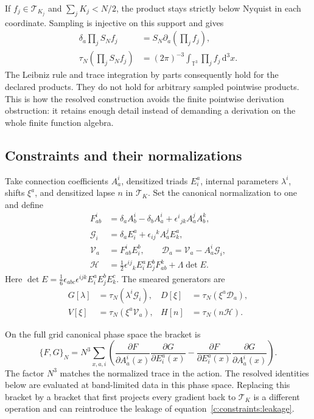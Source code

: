 If $f_j\in\mathcal T_{K_j}$ and $\sum_jK_j<N/2$, the product stays strictly below Nyquist in each coordinate. Sampling is injective on this support and gives
\begin{align}
 \delta_a\prod_jS_Nf_j
 &=S_N\partial_a\left(\prod_jf_j\right),\\
 \tau_N\left(\prod_jS_Nf_j\right)
 &=(2\pi)^{-3}\int_{\mathbb T^3}\prod_jf_j\,\mathrm d^3x.
 \label{c:constraints:alias-free}
\end{align}
The Leibniz rule and trace integration by parts consequently hold for the declared products. They do not hold for arbitrary sampled pointwise products. This is how the resolved construction avoids the finite pointwise derivation obstruction: it retains enough detail instead of demanding a derivation on the whole finite function algebra.

\subsection{Constraints and their normalizations}
Take connection coefficients $A_a^i$, densitized triads $E^a_i$, internal parameters $\lambda^i$, shifts $\xi^a$, and densitized lapse $n$ in $\mathcal T_K$. Set the canonical normalization to one and define
\begin{align}
 F_{ab}^i&=\delta_aA_b^i-\delta_bA_a^i
                    +\epsilon^i{}_{jk}A_a^jA_b^k,\\
 \mathcal G_i&=\delta_aE^a_i+\epsilon_{ij}{}^kA_a^jE^a_k,\\
 \mathcal V_a&=F_{ab}^iE^b_i,\qquad
 \mathcal D_a=\mathcal V_a-A_a^i\mathcal G_i,\\
 \mathcal H&=\tfrac12\epsilon^{ij}{}_kE^a_iE^b_jF_{ab}^k
                                  +\Lambda\det E.
\end{align}
Here $\det E=\tfrac16\epsilon_{abc}\epsilon^{ijk}E^a_iE^b_jE^c_k$.
The smeared generators are
\begin{align}
G[\lambda]&=\tau_N(\lambda^i\mathcal G_i),&
D[\xi]&=\tau_N(\xi^a\mathcal D_a),\\
V[\xi]&=\tau_N(\xi^a\mathcal V_a),&
H[n]&=\tau_N(n\mathcal H).
\end{align}

On the full grid canonical phase space the bracket is
\begin{equation}
 \{F,G\}_N=N^3\sum_{x,a,i}
 \left(\frac{\partial F}{\partial A_a^i(x)}
       \frac{\partial G}{\partial E^a_i(x)}
      -\frac{\partial F}{\partial E^a_i(x)}
       \frac{\partial G}{\partial A_a^i(x)}\right).
\end{equation}
The factor $N^3$ matches the normalized trace in the action. The resolved identities below are evaluated at band-limited data in this phase space. Replacing this bracket by a bracket that first projects every gradient back to $\mathcal T_K$ is a different operation and can reintroduce the leakage of equation~\eqref{c:constraints:leakage}.

